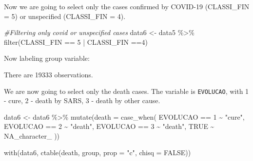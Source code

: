 \documentclass[
]{article}
\newenvironment{Shaded}{\begin{snugshade}}{\end{snugshade}}
\newcommand{\AttributeTok}[1]{\textcolor[rgb]{0.77,0.63,0.00}{#1}}
\newcommand{\CommentTok}[1]{\textcolor[rgb]{0.56,0.35,0.01}{\textit{#1}}}
\newcommand{\ConstantTok}[1]{\textcolor[rgb]{0.00,0.00,0.00}{#1}}
\newcommand{\DecValTok}[1]{\textcolor[rgb]{0.00,0.00,0.81}{#1}}
\newcommand{\FunctionTok}[1]{\textcolor[rgb]{0.00,0.00,0.00}{#1}}
\newcommand{\NormalTok}[1]{#1}
\newcommand{\OtherTok}[1]{\textcolor[rgb]{0.56,0.35,0.01}{#1}}
\newcommand{\SpecialCharTok}[1]{\textcolor[rgb]{0.00,0.00,0.00}{#1}}
\newcommand{\StringTok}[1]{\textcolor[rgb]{0.31,0.60,0.02}{#1}}
\begin{document}
Now we are going to select only the cases confirmed by COVID-19
(CLASSI\_FIN = 5) or unspecified (CLASSI\_FIN = 4).

\begin{Shaded}
\begin{Highlighting}[]
\CommentTok{\#Filtering only covid or unspecified cases}
\NormalTok{data6 }\OtherTok{\textless{}{-}}\NormalTok{ data5 }\SpecialCharTok{\%\textgreater{}\%} 
    \FunctionTok{filter}\NormalTok{(CLASSI\_FIN }\SpecialCharTok{==} \DecValTok{5} \SpecialCharTok{|}\NormalTok{ CLASSI\_FIN }\SpecialCharTok{==}\DecValTok{4}\NormalTok{)}
\end{Highlighting}
\end{Shaded}

Now labeling group variable:

\begin{Shaded}
\end{Shaded}

There are 19333 observations.

We are now going to select only the death cases. The variable is
\texttt{EVOLUCAO}, with 1 - cure, 2 - death by SARS, 3 - death by other
cause.

\begin{Shaded}
\begin{Highlighting}[]
\NormalTok{data6 }\OtherTok{\textless{}{-}}\NormalTok{ data6 }\SpecialCharTok{\%\textgreater{}\%} 
  \FunctionTok{mutate}\NormalTok{(}\AttributeTok{death =} \FunctionTok{case\_when}\NormalTok{(}
\NormalTok{    EVOLUCAO }\SpecialCharTok{==} \DecValTok{1} \SpecialCharTok{\textasciitilde{}} \StringTok{"cure"}\NormalTok{, }
\NormalTok{    EVOLUCAO }\SpecialCharTok{==} \DecValTok{2} \SpecialCharTok{\textasciitilde{}} \StringTok{"death"}\NormalTok{, }
\NormalTok{    EVOLUCAO }\SpecialCharTok{==} \DecValTok{3} \SpecialCharTok{\textasciitilde{}} \StringTok{"death"}\NormalTok{, }
    \ConstantTok{TRUE} \SpecialCharTok{\textasciitilde{}} \ConstantTok{NA\_character\_}
\NormalTok{  ))}

\FunctionTok{with}\NormalTok{(data6, }\FunctionTok{ctable}\NormalTok{(death, group,  }\AttributeTok{prop =} \StringTok{"c"}\NormalTok{, }\AttributeTok{chisq =} \ConstantTok{FALSE}\NormalTok{))}
\end{Highlighting}
\end{Shaded}
\end{document}
